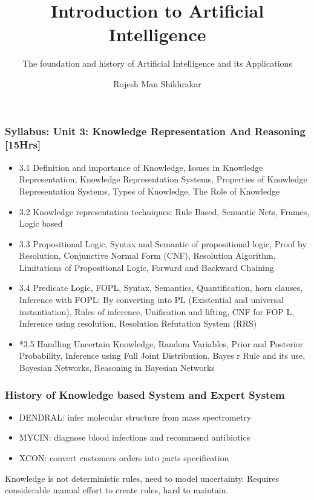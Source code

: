 \documentclass{beamer}
\title{Introduction to Artificial Intelligence}
\subtitle{The foundation and history of Artificial Intelligence and its Applications}
\author[RMS]{Rojesh Man Shikhrakar}
\begin{document}
\maketitle

\begin{frame}
  \frametitle{Syllabus: Unit 3: Knowledge Representation And Reasoning [15Hrs]}
  \begin{itemize}
    \item 3.1 Definition and importance of Knowledge, Issues in Knowledge Representation, Knowledge Representation Systems, Properties of Knowledge Representation Systems, Types of Knowledge, The Role of Knowledge
    \item 3.2 Knowledge representation techniques: Rule Based, Semantic Nets, Frames, Logic based
    \item 3.3 Propositional Logic, Syntax and Semantic of propositional logic, Proof by Resolution, Conjunctive Normal Form (CNF), Resolution Algorithm, Limitations of Propositional Logic, Forward and Backward Chaining
    \item 3.4 Predicate Logic, FOPL, Syntax, Semantics, Quantification, horn clauses, Inference with FOPL: By converting into PL (Existential and universal instantiation), Rules of inference, Unification and lifting, CNF for FOP L, Inference using resolution, Resolution Refutation System (RRS)
    \item *3.5 Handling Uncertain Knowledge, Random Variables, Prior and Posterior Probability, Inference using Full Joint Distribution, Bayes r Rule and its use, Bayesian Networks, Reasoning in Bayesian Networks
  \end{itemize}
\end{frame}


\begin{frame}
  \frametitle{History of Knowledge based System and Expert System}

  \begin{itemize}
    \item DENDRAL: infer molecular structure from mass spectrometry
    \item MYCIN: diagnose blood infections and recommend antibiotics
    \item XCON: convert customers orders into parts specification
  \end{itemize}

  Knowledge is not deterministic rules, need to model uncertainty. Requires considerable manual effort to create rules, hard to maintain.

  

\end{frame}

  
\end{document}
